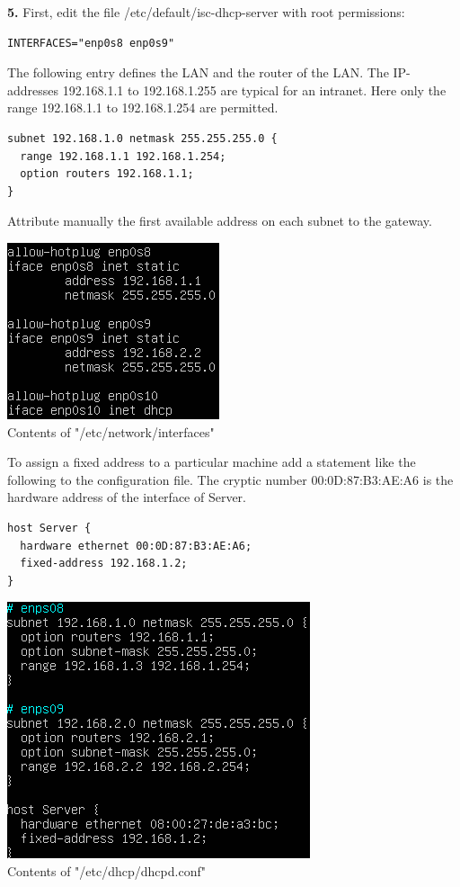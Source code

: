 \documentclass[12pt]{extarticle}
\begin{document}
\textbf{5.} First, edit the file /etc/default/isc-dhcp-server with root permissions:
\begin{verbatim}
INTERFACES="enp0s8 enp0s9"
\end{verbatim}
The following entry defines the LAN and the router of the LAN. The IP-addresses 192.168.1.1 to 192.168.1.255 are typical for an intranet. Here only the range 192.168.1.1 to 192.168.1.254 are permitted.
\begin{verbatim}
subnet 192.168.1.0 netmask 255.255.255.0 {
  range 192.168.1.1 192.168.1.254;
  option routers 192.168.1.1;
}
\end{verbatim}
Attribute manually the first available address on each subnet to the gateway.
\begin{center}
\includegraphics[scale=0.8]{resources/3-1-2.png}\\
Contents of "/etc/network/interfaces"
\end{center}
To assign a fixed address to a particular machine add a statement like the following to the configuration file. The cryptic number 00:0D:87:B3:AE:A6 is the hardware address of the interface of Server.
\begin{verbatim}
host Server {
  hardware ethernet 00:0D:87:B3:AE:A6;
  fixed-address 192.168.1.2;
}
\end{verbatim}
\begin{center}
\includegraphics[scale=0.8]{resources/3-1-1.png}\\
Contents of "/etc/dhcp/dhcpd.conf"
\end{center}
\end{document}
